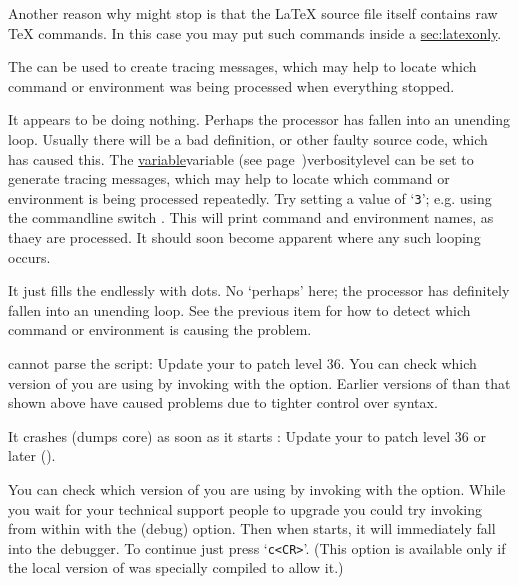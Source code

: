 \begin{htmllist}
Another reason why \latextohtml{} might stop is that the \LaTeX{} source
file itself contains raw \TeX{} commands. In this case you may
put such commands inside a 
\hyperref{environment}{environment (see Section }{)}{sec:latexonly}.

\begin{changebar}
The   can be used
to create tracing messages, which may help to locate which command
or environment was being processed when everything stopped.
\end{changebar}

\begin{changebar}
\item [It appears to be doing nothing.\label{looping}]
Perhaps the processor has fallen into an unending loop.
Usually there will be a bad definition, or other faulty source code,
which has caused this.
The  \hyperref[page]{variable}{variable (see page~}{)}{verbositylevel}%
can be set to generate tracing messages, which may help to locate which command
or environment is being processed repeatedly.
Try setting a value of `\texttt{3}'; e.g. using the commandline switch .
This will print command and environment names, as thaey are processed.
It should soon become apparent where any such looping occurs.

\item [It just fills the endlessly with dots.]
No `perhaps' here; the processor has definitely fallen into an unending loop.
See the previous item for how to detect which command or environment
is causing the problem.
\end{changebar}

\item [\Perl{} cannot parse the \fn{latex2html} script: ]
Update your \Perl{} to patch level 36. You can check which version of
\Perl{} you are using by invoking \Perl{} with the  option.
Earlier versions of \Perl{} than that shown above
have caused problems due to tighter control over syntax.

\item [It crashes (dumps core) as soon as it starts \label{perl}: ]
Update your  to patch level 36 or later ().

You can check which version of
\Perl{} you are using by invoking \Perl{} with the  option.
\html{\\}
While you wait for your technical support people to upgrade \Perl{}
you could try invoking \Perl{} from within \latextohtml{} with
the  (debug) option. Then when \latextohtml{} starts, it will
immediately fall into the \Perl{} debugger. To continue just press
`\texttt{c<CR>}'. (This option is available only if the
local version of \Perl{} was specially compiled to allow it.)



\end{htmllist}
